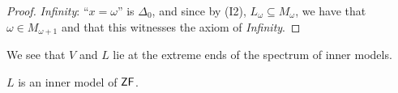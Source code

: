 \begin{proof}
\textit{Infinity}: ``$x = \omega$'' is $\Delta_0$, and since by (I2), $L_\omega \subseteq M_\omega$, we have that $\omega \in M_{\omega+1}$ and that this witnesses the axiom of \textit{Infinity}.

\end{proof}We see that $V$ and $L$ lie at the extreme ends of the spectrum of inner models.

\begin{corollary}\label{cor-l-inner-model}$L$ is an inner model of $\mathsf{ZF}$.

\end{corollary}